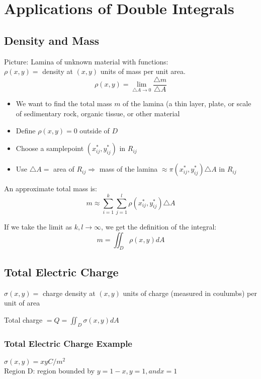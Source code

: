 \documentclass[12pt]{article}
\begin{document}
\section{Applications of Double Integrals}
\subsection{Density and Mass}
Picture: Lamina of unknown material with functions: \\
\(\rho(x,y) = \) density at \((x,y)\) units of mass per unit area.
\[
	\rho(x,y) = \lim_{\triangle A \to 0} \frac{\triangle m}{\triangle A}
\]
\begin{itemize}
	\item We want to find the total mass \(m\) of the lamina (a thin layer, plate, or scale of sedimentary rock, organic tissue, or other material
	\item Define \(\rho(x,y)=0	\) outside of \(D\)
	\item Choose a samplepoint \((x^{*}_{ij}, y^{*}_{ij})\) in \(R_{ij}\)
	\item Use \(\triangle A = \) area of \(R_{ij} \Rightarrow \) mass of the lamina \(\approx \pi(x^{*}_{ij}, y^{*}_{ij})\triangle A\) in \(R_{ij}\)
\end{itemize}

An approximate total mass is: 
\[
	m \approx \sum_{i=1}^{k} \sum_{j = 1}^{l} \rho(x^{*}_{ij}, y^{*}_{ij})\triangle A
\]

If we take the limit as \(k, l \to \infty\), we get the definition of the integral:
\[
	m = \iint_{D}\rho(x,y)dA
\]

\subsection{Total Electric Charge}
\(\sigma (x,y) = \) charge density at \((x,y)\) units of charge (measured in coulumbs) per unit of area

Total charge \(= Q = \iint_{D}\sigma (x,y) dA	\) 
\subsubsection{Total Electric Charge Example}
\(\sigma (x,y) = xy C/m^{2}\) \\
Region D: region bounded by \(y = 1-x, y=1, and x = 1\)
\end{document}
